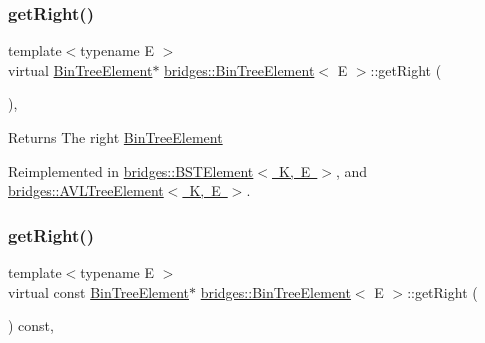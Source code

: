 \subsubsection{\texorpdfstring{get\+Right()}{getRight()}\hspace{0.1cm}{\footnotesize\ttfamily [1/2]}}
{\footnotesize\ttfamily template$<$typename E $>$ \\
virtual \mbox{\hyperlink{classbridges_1_1_bin_tree_element}{Bin\+Tree\+Element}}$\ast$ \mbox{\hyperlink{classbridges_1_1_bin_tree_element}{bridges\+::\+Bin\+Tree\+Element}}$<$ E $>$\+::get\+Right (\begin{DoxyParamCaption}{ }\end{DoxyParamCaption})\hspace{0.3cm}{\ttfamily [inline]}, {\ttfamily [virtual]}}

\begin{DoxyReturn}{Returns}
The right \mbox{\hyperlink{classbridges_1_1_bin_tree_element}{Bin\+Tree\+Element}} 
\end{DoxyReturn}


Reimplemented in \mbox{\hyperlink{classbridges_1_1_b_s_t_element_a35e93bce32de933522dccde5f2b5ffd9}{bridges\+::\+B\+S\+T\+Element$<$ K, E $>$}}, and \mbox{\hyperlink{classbridges_1_1_a_v_l_tree_element_a909b46ebf3e8c6a3434762a1f01499e2}{bridges\+::\+A\+V\+L\+Tree\+Element$<$ K, E $>$}}.

\mbox{\label{classbridges_1_1_bin_tree_element_aa01980f4be18f6c205580ea0376a0d07}} 
\subsubsection{\texorpdfstring{get\+Right()}{getRight()}\hspace{0.1cm}{\footnotesize\ttfamily [2/2]}}
{\footnotesize\ttfamily template$<$typename E $>$ \\
virtual const \mbox{\hyperlink{classbridges_1_1_bin_tree_element}{Bin\+Tree\+Element}}$\ast$ \mbox{\hyperlink{classbridges_1_1_bin_tree_element}{bridges\+::\+Bin\+Tree\+Element}}$<$ E $>$\+::get\+Right (\begin{DoxyParamCaption}{ }\end{DoxyParamCaption}) const\hspace{0.3cm}{\ttfamily [inline]}, {\ttfamily [virtual]}}

